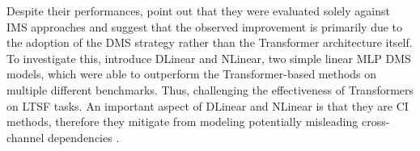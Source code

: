 \documentclass[a4paper,oneside,bibliography=totoc]{scrbook}
\begin{document}
Despite their performances, 
\citet{zeng_are_2023} point out that they were evaluated solely against IMS approaches and suggest that the observed improvement is primarily due to the adoption of the DMS strategy rather than the Transformer architecture itself.
To investigate this, \citet{zeng_are_2023} introduce DLinear and NLinear, two simple linear MLP DMS models, which were able to outperform the Transformer-based methods on multiple different benchmarks. 
Thus, challenging the effectiveness of Transformers on LTSF tasks.
An important aspect of DLinear and NLinear is that they are CI methods, therefore they mitigate from modeling potentially misleading cross-channel dependencies \cite{nie_time_2022}. 
\end{document}
